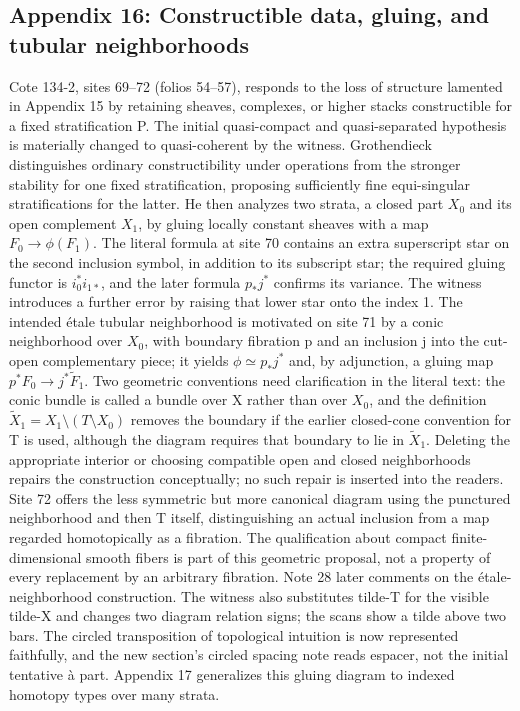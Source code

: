 \subsection*{Appendix 16: Constructible data, gluing, and tubular neighborhoods}
Cote 134-2, sites 69--72 (folios 54--57), responds to the loss of structure lamented in Appendix 15 by retaining sheaves, complexes, or higher stacks constructible for a fixed stratification P. The initial quasi-compact and quasi-separated hypothesis is materially changed to quasi-coherent by the witness. Grothendieck distinguishes ordinary constructibility under operations from the stronger stability for one fixed stratification, proposing sufficiently fine equi-singular stratifications for the latter. He then analyzes two strata, a closed part $X_0$ and its open complement $X_1$, by gluing locally constant sheaves with a map $F_0\to\phi(F_1)$. The literal formula at site 70 contains an extra superscript star on the second inclusion symbol, in addition to its subscript star; the required gluing functor is $i_0^*i_{1*}$, and the later formula $p_*j^*$ confirms its variance. The witness introduces a further error by raising that lower star onto the index 1. The intended étale tubular neighborhood is motivated on site 71 by a conic neighborhood over $X_0$, with boundary fibration p and an inclusion j into the cut-open complementary piece; it yields $\phi\simeq p_*j^*$ and, by adjunction, a gluing map $p^*F_0\to j^*\widetilde F_1$. Two geometric conventions need clarification in the literal text: the conic bundle is called a bundle over X rather than over $X_0$, and the definition $\widetilde X_1=X_1\setminus(T\setminus X_0)$ removes the boundary if the earlier closed-cone convention for T is used, although the diagram requires that boundary to lie in $\widetilde X_1$. Deleting the appropriate interior or choosing compatible open and closed neighborhoods repairs the construction conceptually; no such repair is inserted into the readers. Site 72 offers the less symmetric but more canonical diagram using the punctured neighborhood and then T itself, distinguishing an actual inclusion from a map regarded homotopically as a fibration. The qualification about compact finite-dimensional smooth fibers is part of this geometric proposal, not a property of every replacement by an arbitrary fibration. Note 28 later comments on the étale-neighborhood construction. The witness also substitutes tilde-T for the visible tilde-X and changes two diagram relation signs; the scans show a tilde above two bars. The circled transposition of topological intuition is now represented faithfully, and the new section's circled spacing note reads espacer, not the initial tentative à part. Appendix 17 generalizes this gluing diagram to indexed homotopy types over many strata.

